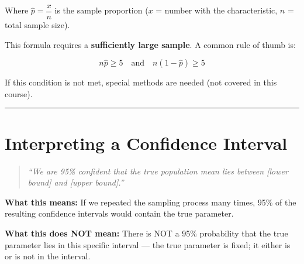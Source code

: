 \documentclass[
  12pt,
  letterpaper,
]{book}
\begin{document}
Where \(\hat{p} = \dfrac{x}{n}\) is the sample proportion (\(x\) =
number with the characteristic, \(n\) = total sample size).

\begin{tcolorbox}[enhanced jigsaw, arc=.35mm, bottomrule=.15mm, bottomtitle=1mm, breakable, colback=white, colbacktitle=quarto-callout-warning-color!10!white, colframe=quarto-callout-warning-color-frame, coltitle=black, left=2mm, leftrule=.75mm, opacityback=0, opacitybacktitle=0.6, rightrule=.15mm, title={⚠️ When Is This Formula Valid?}, titlerule=0mm, toprule=.15mm, toptitle=1mm]

This formula requires a \textbf{sufficiently large sample}. A common
rule of thumb is:

\[n\hat{p} \geq 5 \quad \text{and} \quad n(1-\hat{p}) \geq 5\]

If this condition is not met, special methods are needed (not covered in
this course).

\end{tcolorbox}

\begin{center}\rule{0.5\linewidth}{0.5pt}\end{center}


\chapter{Interpreting a Confidence
Interval}\label{interpreting-a-confidence-interval}

\begin{tcolorbox}[enhanced jigsaw, arc=.35mm, bottomrule=.15mm, bottomtitle=1mm, breakable, colback=white, colbacktitle=quarto-callout-important-color!10!white, colframe=quarto-callout-important-color-frame, coltitle=black, left=2mm, leftrule=.75mm, opacityback=0, opacitybacktitle=0.6, rightrule=.15mm, title={✅ Correct Interpretation}, titlerule=0mm, toprule=.15mm, toptitle=1mm]

\begin{quote}
\emph{``We are 95\% confident that the true population mean lies between
{[}lower bound{]} and {[}upper bound{]}.''}
\end{quote}

\textbf{What this means:} If we repeated the sampling process many
times, 95\% of the resulting confidence intervals would contain the true
parameter.

\textbf{What this does NOT mean:} There is NOT a 95\% probability that
the true parameter lies in this specific interval --- the true parameter
is fixed; it either is or is not in the interval.

\end{tcolorbox}
\end{document}
